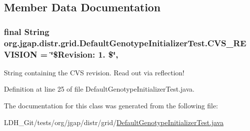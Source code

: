 \subsection{Member Data Documentation}
\hypertarget{classorg_1_1jgap_1_1distr_1_1grid_1_1_default_genotype_initializer_test_ac6bd36a4f18aee0339d8a450e9107472}{
\subsubsection[{C\-V\-S\-\_\-\-R\-E\-V\-I\-S\-I\-O\-N}]{\setlength{\rightskip}{0pt plus 5cm}final String org.\-jgap.\-distr.\-grid.\-Default\-Genotype\-Initializer\-Test.\-C\-V\-S\-\_\-\-R\-E\-V\-I\-S\-I\-O\-N = \char`\"{}\$Revision\-: 1. \$\char`\"{}\hspace{0.3cm}{\ttfamily [static]}, {\ttfamily [private]}}}\label{classorg_1_1jgap_1_1distr_1_1grid_1_1_default_genotype_initializer_test_ac6bd36a4f18aee0339d8a450e9107472}
String containing the C\-V\-S revision. Read out via reflection! 

Definition at line 25 of file Default\-Genotype\-Initializer\-Test.\-java.



The documentation for this class was generated from the following file\-:\begin{DoxyCompactItemize}
\item 
L\-D\-H\-\_\-\-Git/tests/org/jgap/distr/grid/\hyperlink{_default_genotype_initializer_test_8java}{Default\-Genotype\-Initializer\-Test.\-java}\end{DoxyCompactItemize}

